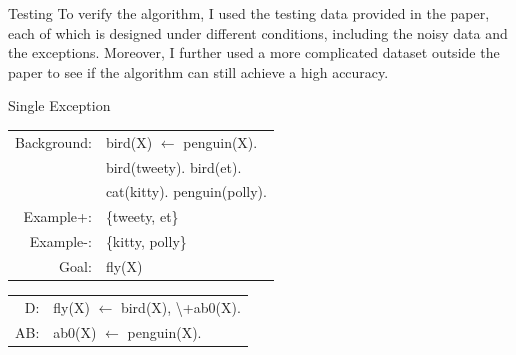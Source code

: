 \documentclass[12pt,a4paper]{article}
\begin{document}
	\begin{section}{Testing}
		To verify the algorithm, I used the testing data provided in the paper, each of which is designed under different conditions, including the noisy data and the exceptions. Moreover, I further used a more complicated dataset outside the paper to see if the algorithm can still achieve a high accuracy.
		\vspace{4em}
		\renewcommand{\arraystretch}{1.3}
		\begin{subsection}{Single Exception}
			\begin{multicols}{2}
				 \vspace{-1em}
				\begin{table}[H]
					\begin{tabular}{rl}
					Background: & bird(X) $\leftarrow$ penguin(X). \\
					            & bird(tweety). bird(et).                       \\
					            & cat(kitty). penguin(polly).                   \\
					Example+:   & \{tweety, et\}                                \\
					Example-:   & \{kitty, polly\}                              \\
					Goal:       & fly(X)                                      
					\end{tabular}
				\end{table}
				\columnbreak
				 \vspace{-1em}
				\begin{table}[H]
					\begin{tabular}{rl}
					D: & fly(X) $\leftarrow$ bird(X), \textbackslash{+ab0(X)}. \\
					AB:& ab0(X) $\leftarrow$ penguin(X).\\
					\end{tabular}
				\end{table}
			\end{multicols}
		\end{subsection}
		

\end{section}
\end{document}
